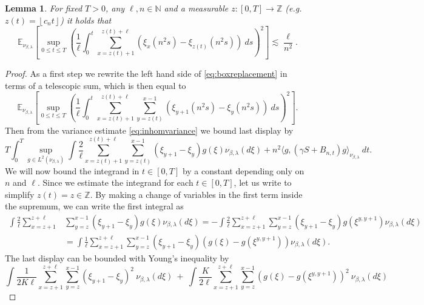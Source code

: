 \documentclass[a4paper, reqno, 12pt]{amsart}
\theoremstyle{plain}
\newtheorem{lemma}[definition]{Lemma}
\theoremstyle{definition}
\newcommand{\floor}[1]{\left\lfloor #1 \right\rfloor}
\newcommand{\parent}[1]{\left( #1 \right)}
\newcommand{\ee}[1]{\mathbb{E}_{\nu_{\beta,\lambda}}\left[ #1 \right]}
\newcommand{\Z}{\mathbb{Z}}
\newcommand{\N}{\mathbb{N}}
\begin{document}
\begin{lemma} \label{lem:boxreplacement}
For fixed $T>0$, any $\ell,n\in\N$ and a measurable $z:[0,T]\to \Z$ (e.g. $z(t) = \floor{c_nt}$) it holds that 
\begin{equation} \label{eq:boxreplacement}
    \ee{\sup_{0\leq t\leq T} \left( \frac{1}{\ell}\int_0^t \sum_{x=z(t)+1 }^{z(t)+\ell}(\xi_{x}(n^2 s) -\xi_{z(t)}(n^2 s))\  ds \right)^2}  \lesssim \frac{\ell}{n^2}.
\end{equation}
\end{lemma}

\begin{proof} 
As a first step we rewrite the left hand side of \eqref{eq:boxreplacement} in terms of a telescopic sum, which is then equal to
\begin{equation*}
     \ee{\sup_{0\leq t\leq T} \parent{\frac{1}{\ell}\int_0^t \sum_{x=z(t)+1 }^{z(t)+\ell} \sum_{y = z(t)}^{x-1} (\xi_{y+1}(n^2 s) -\xi_y(n^2 s))\  ds }^2}.
\end{equation*}
Then from the variance estimate \eqref{eq:inhomvariance} we bound last display by 
\begin{equation} \label{eq:boxvariancebound}
T\int_0^T\sup_{g\in L^2(\nu_{\beta,\lambda})} \int \frac{2}{\ell} \sum_{x=z(t)+1 }^{z(t)+\ell} \sum_{y = z(t)}^{x-1} (\xi_{y+1} -\xi_y)g(\xi) \nu_{\beta,\lambda}(d\xi) + n^2  \langle g,(\gamma S+B_{n,t})g\rangle_{\nu_{\beta,\lambda}} \ dt.
\end{equation} 
We will now bound the integrand in $t \in [0,T]$ by a constant depending only on $n$ and $\ell$. Since we estimate the integrand for each $t\in[0,T]$, let us write to simplify $z(t) =z\in\Z$.  By making a change of variables in the first term inside the supremum, we can write the first integral as
\begin{equation*}
\begin{split}
    \int \frac{2}{\ell} \sum_{x=z+1 }^{z+\ell} &\sum_{y = z}^{x-1} (\xi_{y+1} -\xi_y) g(\xi) \nu_{\beta,\lambda}(d\xi) = - \int \frac{2}{\ell} \sum_{x=z+1 }^{z+\ell} \sum_{y = z}^{x-1} (\xi_{y+1} -\xi_y) g(\xi^{y,y+1}) \nu_{\beta,\lambda}(d\xi) \\
    & = \int \frac{1}{\ell} \sum_{x=z+1 }^{z+\ell} \sum_{y = z}^{x-1} (\xi_{y+1} -\xi_y) (g(\xi)- g(\xi^{y,y+1})) \nu_{\beta,\lambda}(d\xi).
\end{split}
\end{equation*}
The last display can be bounded with Young's inequality by
\begin{equation*}
    \int \frac{1}{2K\ell} \sum_{x=z+1 }^{z+\ell} \sum_{y = z}^{x-1} (\xi_{y+1} -\xi_y)^2 \ \nu_{\beta,\lambda}(d\xi) \ +\  \int \frac{K}{2\ell} \sum_{x=z+1 }^{z+\ell} \sum_{y = z}^{x-1} (g(\xi)- g(\xi^{y,y+1}))^2 \ \nu_{\beta,\lambda}(d\xi)

\end{equation*}
\end{proof}
\end{document}
